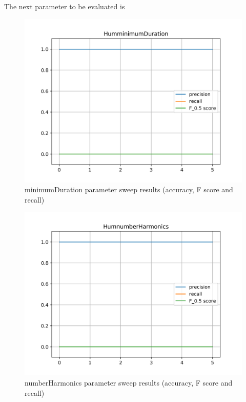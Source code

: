 The next parameter to be evaluated is 

\begin{figure}[!ht]
	\includegraphics[clip,width=\columnwidth]{Figures/HumminimumDuration.png}%
	\caption{minimumDuration parameter sweep results (accuracy, F score and recall)}
	\label{fig:humminimumDuration}
\end{figure}

\begin{figure}[!ht]
	\includegraphics[clip,width=\columnwidth]{Figures/HumnumberHarmonics.png}%
	\caption{numberHarmonics parameter sweep results (accuracy, F score and recall)}
	\label{fig:humnumberHarmonics}
\end{figure}

